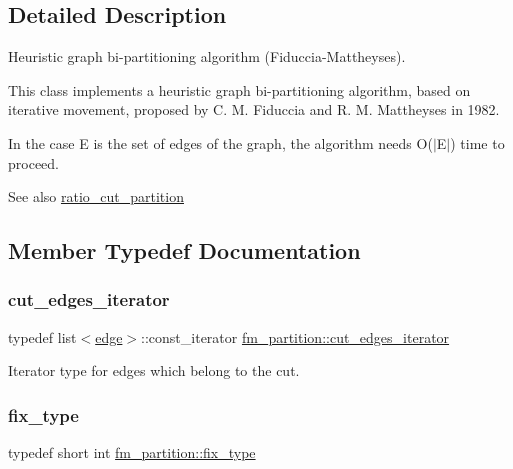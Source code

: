 \subsection{Detailed Description}
Heuristic graph bi-\/partitioning algorithm (Fiduccia-\/\+Mattheyses). 

This class implements a heuristic graph bi-\/partitioning algorithm, based on iterative movement, proposed by C. M. Fiduccia and R. M. Mattheyses in 1982.

In the case E is the set of edges of the graph, the algorithm needs {\ttfamily O($\vert$\+E$\vert$)} time to proceed.

\begin{DoxySeeAlso}{See also}
\mbox{\hyperlink{classratio__cut__partition}{ratio\+\_\+cut\+\_\+partition}} 
\end{DoxySeeAlso}


\subsection{Member Typedef Documentation}
\mbox{\label{classfm__partition_aede10aea3dda6be8014ce60fca728efe}} 
\subsubsection{\texorpdfstring{cut\+\_\+edges\+\_\+iterator}{cut\_edges\_iterator}}
{\footnotesize\ttfamily typedef list$<$\mbox{\hyperlink{classedge}{edge}}$>$\+::const\+\_\+iterator \mbox{\hyperlink{classfm__partition_aede10aea3dda6be8014ce60fca728efe}{fm\+\_\+partition\+::cut\+\_\+edges\+\_\+iterator}}}

Iterator type for edges which belong to the cut. \mbox{\label{classfm__partition_a63693cd93d587dca3d1842f831cd1c55}} 
\subsubsection{\texorpdfstring{fix\+\_\+type}{fix\_type}}
{\footnotesize\ttfamily typedef short int \mbox{\hyperlink{classfm__partition_a63693cd93d587dca3d1842f831cd1c55}{fm\+\_\+partition\+::fix\+\_\+type}}}

